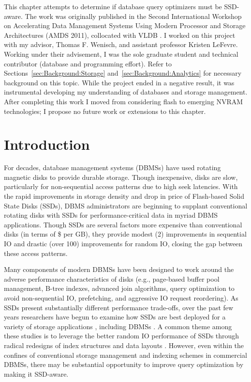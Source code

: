 This chapter attempts to determine if database query optimizers must be SSD-aware.
The work was originally published in the Second International Workshop on Accelerating Data Management Systems Using Modern Processor and Storage Architectures (AMDS 2011), collocated with VLDB .
I worked on this project with my advisor, Thomas F. Wenisch, and assistant professor Kristen LeFevre.
Working under their advisement, I was the sole graduate student and technical contributor (database and programming effort).
Refer to Sections~\ref{sec:Background:Storage} and~\ref{sec:Background:Analytics} for necessary background on this topic.
While the project ended in a negative result, it was instrumental developing my understanding of databases and storage management.
After completing this work I moved from considering flash to emerging NVRAM technologies; I propose no future work or extensions to this chapter.

\section{Introduction}
\label{sec:FlashOpti:Intro}

For decades, database management systems (DBMSs) have used rotating magnetic disks to provide durable storage.
Though inexpensive, disks are slow, particularly for non-sequential access patterns due to high seek latencies.
With the rapid improvements in storage density and drop in price of Flash-based Solid State Disks (SSDs), DBMS administrators are beginning to supplant conventional rotating disks with SSDs for performance-critical data in myriad DBMS applications.
Though SSDs are several factors more expensive than conventional disks (in terms of \$ per GB), they provide modest (2\texttimes) improvements in sequential IO and drastic (over 100\texttimes) improvements for random IO, closing the gap between these access patterns.

Many components of modern DBMSs have been designed to work around the adverse performance characteristics of disks (e.g., page-based buffer pool management, B-tree indexes, advanced join algorithms, query optimization to avoid non-sequential IO, prefetching, and aggressive IO request reordering).  
As SSDs present substantially different performance trade-offs, over the past few years researchers have begun to examine how SSDs are best deployed for a variety of storage applications \cite{Bouganim09uflip:understanding, Chen2009}, including DBMSs \cite{Lee2008, Yin2009, Li2009, Baumann2010, Tsirogiannis2009}.  
A common theme among these studies is to leverage the better random IO performance of SSDs through radical redesigns of index structures \cite{Yin2009, Li2009} and data layouts \cite{Baumann2010, Tsirogiannis2009}. 
However, even within the confines of conventional storage management and indexing schemes in commercial DBMSs, there may be substantial opportunity to improve query optimization by making it SSD-aware.

